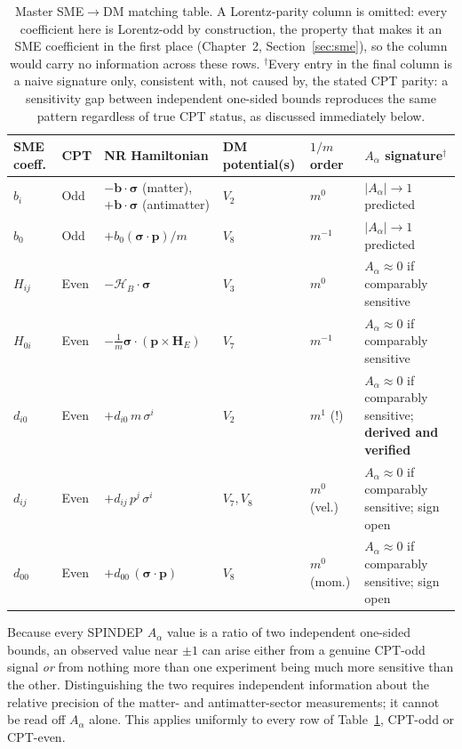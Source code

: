 \documentclass[main]{subfiles}
\begin{document}
\begin{table}[h]
\centering
\small
\begin{tabular}{@{}l l >{\raggedright\arraybackslash}p{3.3cm} l l >{\raggedright\arraybackslash}p{3cm}@{}}
\toprule
SME coeff. & CPT & NR Hamiltonian & DM potential(s) & $1/m$ order & $A_\alpha$ signature$^\dagger$ \\
\midrule
$b_i$ & Odd & $-\mathbf b\cdot\boldsymbol\sigma$ (matter), $+\mathbf b\cdot\boldsymbol\sigma$ (antimatter) & $V_2$ & $m^0$ & $|A_\alpha|\to1$ predicted \\
$b_0$ & Odd & $+b_0(\boldsymbol\sigma\cdot\mathbf p)/m$ & $V_8$ & $m^{-1}$ & $|A_\alpha|\to1$ predicted \\
$H_{ij}$ & Even & $-\boldsymbol{\mathcal H}_B\cdot\boldsymbol\sigma$ & $V_3$ & $m^0$ & $A_\alpha\approx0$ if comparably sensitive \\
$H_{0i}$ & Even & $-\tfrac1m\boldsymbol\sigma\cdot(\mathbf p\times\mathbf H_E)$ & $V_7$ & $m^{-1}$ & $A_\alpha\approx0$ if comparably sensitive \\
$d_{i0}$ & Even & $+d_{i0}\,m\,\sigma^i$ & $V_2$ & $m^1$ (!) & $A_\alpha\approx0$ if comparably sensitive; \textbf{derived and verified} \\
$d_{ij}$ & Even & $+d_{ij}\,p^j\,\sigma^i$ & $V_7, V_8$ & $m^0$ (vel.) & $A_\alpha\approx0$ if comparably sensitive; sign open \\
$d_{00}$ & Even & $+d_{00}\,(\boldsymbol\sigma\cdot\mathbf p)$ & $V_8$ & $m^0$ (mom.) & $A_\alpha\approx0$ if comparably sensitive; sign open \\
\bottomrule
\end{tabular}
\caption{Master SME$\to$DM matching table. A Lorentz-parity column is
omitted: every coefficient here is Lorentz-odd by construction, the
property that makes it an SME coefficient in the first place (Chapter~2,
Section~\ref{sec:sme}), so the column would carry no information across
these rows. $^\dagger$Every entry in the final column is a naive signature
only, consistent with, not caused by, the stated CPT parity: a sensitivity
gap between independent one-sided bounds reproduces the same pattern
regardless of true CPT status, as discussed immediately below.}
\label{tab:master}
\end{table}

Because every SPINDEP $A_\alpha$ value is a ratio of two independent
one-sided bounds, an observed value near $\pm1$ can arise either from a
genuine CPT-odd signal \emph{or} from nothing more than one experiment being
much more sensitive than the other. Distinguishing the two requires
independent information about the relative precision of the matter- and
antimatter-sector measurements; it cannot be read off $A_\alpha$ alone.
This applies uniformly to every row of Table~\ref{tab:master}, CPT-odd or
CPT-even.
\end{document}
